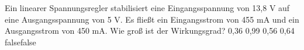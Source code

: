    {Ein linearer Spannungsregler stabilisiert eine Eingangsspannung von 13,8 V auf eine Ausgangsspannung von 5 V. Es fließt ein Eingangsstrom von 455 mA und ein Ausgangsstrom von 450 mA. Wie groß ist der Wirkungsgrad?}
    {0,36}
    {0,99}
    {0,56}
    {0,64}
    {false}{false}
